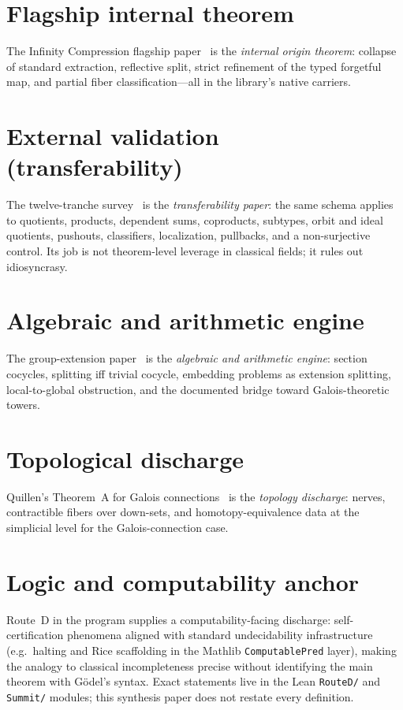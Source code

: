 \documentclass[11pt]{article}
\begin{document}
\section{Flagship internal theorem}

The Infinity Compression flagship paper~\cite{SpivackIC} is the \emph{internal origin
theorem}: collapse of standard extraction, reflective split, strict refinement of the
typed forgetful map, and partial fiber classification---all in the library's native
carriers.

\section{External validation (transferability)}

The twelve-tranche survey~\cite{SpivackValidation} is the \emph{transferability paper}: the
same schema applies to quotients, products, dependent sums, coproducts, subtypes,
orbit and ideal quotients, pushouts, classifiers, localization, pullbacks, and a
non-surjective control. Its job is not theorem-level leverage in classical fields; it
rules out idiosyncrasy.

\section{Algebraic and arithmetic engine}

The group-extension paper~\cite{SpivackFiber} is the \emph{algebraic and arithmetic engine}:
section cocycles, splitting iff trivial cocycle, embedding problems as extension splitting,
local-to-global obstruction, and the documented bridge toward Galois-theoretic towers.

\section{Topological discharge}

Quillen's Theorem~A for Galois connections~\cite{SpivackQuillen} is the \emph{topology
discharge}: nerves, contractible fibers over down-sets, and homotopy-equivalence data at
the simplicial level for the Galois-connection case.

\section{Logic and computability anchor}

Route~D in the program supplies a computability-facing discharge: self-certification
phenomena aligned with standard undecidability infrastructure (e.g.\ halting and Rice
scaffolding in the Mathlib \texttt{ComputablePred} layer), making the analogy to
classical incompleteness precise without identifying the main theorem with G\"odel's
syntax. Exact statements live in the Lean \texttt{RouteD/} and \texttt{Summit/} modules;
this synthesis paper does not restate every definition.
\end{document}
